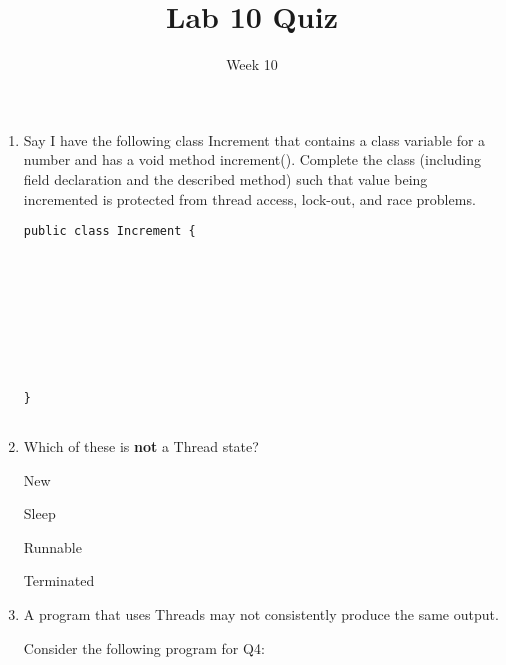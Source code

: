 \documentclass[addpoints]{exam}
\title{Lab 10 Quiz}
\date{Week 10}
\begin{document}
 

\Instructions

\begin{enumerate}
\vspace{2em}

\item
\question {} Say I have the following class Increment that contains a class variable for a number and has a void method increment(). Complete the class (including field declaration and the described method) such that value being incremented is protected from thread access, lock-out, and race problems. 

\newline
\begin{lstlisting}
public class Increment {
    
    
    
    
    
    
    
    
    
}


\end{lstlisting}
\newline

\newline
\item
\question {} Which of these is \textbf{not} a Thread state?

\begin{oneparchoices} 
\hspace{0.2cm}
 \choice New\newline
 
 \choice  Sleep \newline
 
 \choice Runnable \newline
 
 \choice Terminated \newline

\end{oneparchoices}


\item {} \tf  A program that uses Threads may not consistently produce the same output.
\vspace{1em}

\newline
\newline
\newline
\newline
\newline
Consider the following program for Q4:


\end{enumerate}
\end{document}
